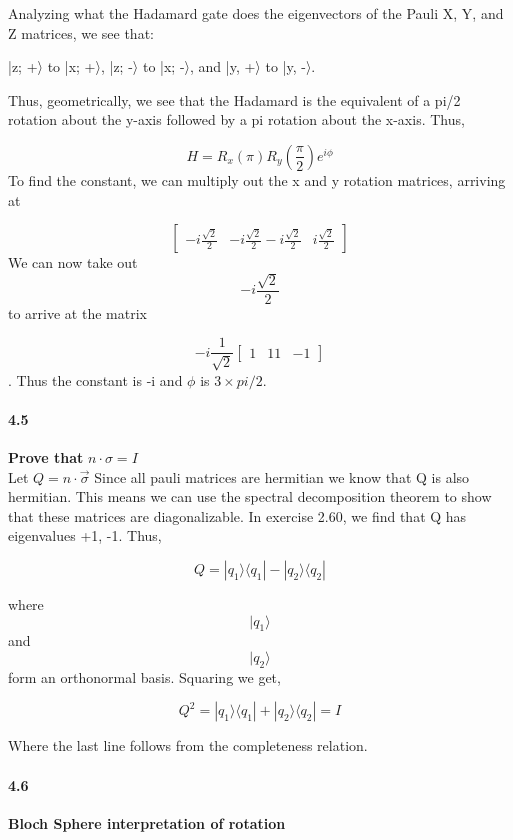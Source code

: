 Analyzing what the Hadamard gate does the eigenvectors of the Pauli X, Y, and Z matrices, we see that: 


|z; +〉  to |x; +〉,
|z; -〉 to |x; -〉, and
|y, +〉 to |y, -〉.


Thus, geometrically, we see that the Hadamard is the equivalent of a pi/2 rotation about the y-axis followed by a pi rotation about the x-axis. Thus,


$$H = R_{x}(\pi) R_{y}(\frac{\pi}{2}) e^{i\phi}$$
To find the constant, we can multiply out the x and y rotation matrices, arriving at


$$\begin{bmatrix} -i\frac{\sqrt{2}}{2} & -i\frac{\sqrt{2}}{2} 
-i\frac{\sqrt{2}}{2} & i\frac{\sqrt{2}}{2} 
\end{bmatrix} $$
We can now take out $$-i\frac{\sqrt{2}}{2}$$ to arrive at the matrix
 
$$ -i\frac{1}{\sqrt{2}} \begin{bmatrix} 1& 1
1& -1
\end{bmatrix} $$.
Thus the constant is -i and $\phi$ is $3\times pi/2$.

\paragraph{4.5} \textbf{Prove that } $n\cdot \sigma = I$
\\


Let $Q = {n} \cdot \vec{\sigma}$ Since all pauli matrices are hermitian we know that Q is also hermitian. This means we can use the spectral decomposition theorem to show that these matrices are diagonalizable. In exercise 2.60, we find that Q has eigenvalues +1, -1. Thus, 


$$Q = |q_1\rangle \langle q_1| - |q_2\rangle \langle q_2|$$


where $$|q_1\rangle$$ and $$|q_2\rangle$$ form an orthonormal basis. Squaring we get, 


$$Q^2 = |q_1\rangle \langle q_1| + |q_2\rangle \langle q_2| = I$$


Where the last line follows from the completeness relation. 


\paragraph{4.6} \textbf{Bloch Sphere interpretation of rotation}
\\

